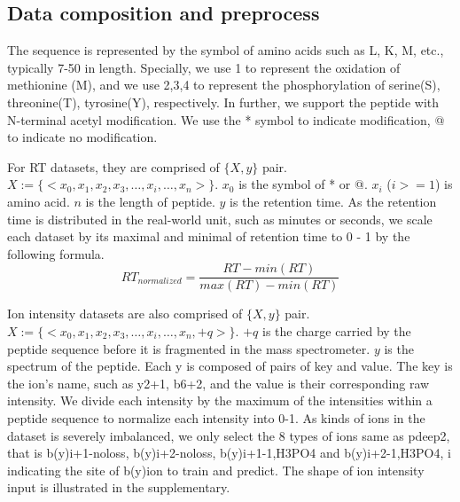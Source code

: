 
\subsection{Data composition and preprocess}
The sequence is represented by the symbol of amino acids such as L, K, M, etc., typically 7-50 in length. Specially, we use 1 to represent the oxidation of methionine (M), and we use 2,3,4 to represent the phosphorylation of serine(S), threonine(T), tyrosine(Y), respectively. In further, we support the peptide with N-terminal acetyl modification. We use the * symbol to indicate modification, @ to indicate no modification. 

For RT datasets, they are comprised of \( \{X, y\} \) pair. 
$X:= \{ <x_0, x_1, x_2, x_3,\dots, x_i, \dots, x_n>\}$. $x_0$ is the symbol of * or @. 
$x_i$ ($i>= 1$) is amino acid. $n$ is the length of peptide. \( y \) is the retention time. 
As the retention time is distributed in the real-world unit, such as minutes or seconds, we scale each dataset by its maximal and minimal of retention time to 0 - 1 by the following formula. 
\[RT_{normalized} = \frac{RT-min(RT)}{max(RT)-min(RT)}\]



Ion intensity datasets are also comprised of \( \{X, y\} \) pair. 
$X := \{ <x_0, x_1, x_2, x_3,\dots, x_i, \dots, x_n, +q> \}$. $+q$
is the charge carried by the peptide sequence before it is fragmented in the mass spectrometer. \( y \) is the spectrum of the peptide. Each y is composed of pairs of key and value.
The key is the ion's name, such as y2+1, b6+2, and the value is their corresponding raw intensity.
We divide each intensity by the maximum of the intensities within a peptide sequence to normalize each intensity into 0-1. As kinds of ions in the dataset is severely imbalanced, we only select the 8 types of ions same as pdeep2, that is b(y)i+1-noloss, b(y)i+2-noloss, b(y)i+1-1,H3PO4 and b(y)i+2-1,H3PO4, i indicating the site of b(y)ion to train and predict. The shape of ion intensity input is illustrated in the supplementary.




